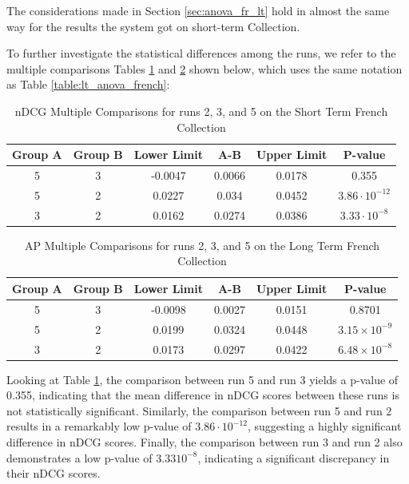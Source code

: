 The considerations made in Section \ref{sec:anova_fr_lt} hold in almost the same way for the results the system got on short-term Collection.  

To further investigate the statistical differences among the runs, we refer to the multiple comparisons Tables \ref{table:st_anova_french} and \ref{table:st_anova_french_ap} shown below, which uses the same notation as Table \ref{table:lt_anova_french}:

\begin{table}[!h]
    \centering
    \caption{\ac{nDCG} Multiple Comparisons for runs 2, 3, and 5 on the Short Term French Collection}
    \label{table:st_anova_french}
    \begin{tabular}{cccccc}
    \hline
    Group A & Group B & Lower Limit & A-B & Upper Limit & P-value \\ \hline
    5 & 3 & -0.0047 & 0.0066 & 0.0178 & 0.355 \\
    5 & 2 & 0.0227 & 0.034 & 0.0452 & $3.86 \cdot 10^{-12}$ \\
    3 & 2 & 0.0162 & 0.0274 & 0.0386 & $3.33 \cdot 10^{-8}$ \\ \hline
    \end{tabular}
\end{table}

\begin{table}[!h]
    \centering
    \caption{\ac{AP} Multiple Comparisons for runs 2, 3, and 5 on the Long Term French Collection}
    \label{table:st_anova_french_ap}
    \begin{tabular}{cccccc}
    \hline
    Group A & Group B & Lower Limit & A-B & Upper Limit & P-value \\ \hline
    5 & 3 & -0.0098 & 0.0027 & 0.0151 & 0.8701 \\
    5 & 2 & 0.0199 & 0.0324 & 0.0448 & $3.15 \times 10^{-9}$ \\
    3 & 2 & 0.0173 & 0.0297 & 0.0422 & $6.48 \times 10^{-8}$ \\ \hline
    \end{tabular}
\end{table}
 
Looking at Table \ref{table:st_anova_french}, the comparison between run 5 and run 3 yields a p-value of 0.355, indicating that the mean difference in \ac{nDCG} scores between these runs is not statistically significant. 
Similarly, the comparison between run 5 and run 2 results in a remarkably low p-value of $3.86 \cdot 10^{-12}$, suggesting a highly significant difference in \ac{nDCG} scores. 
Finally, the comparison between run 3 and run 2 also demonstrates a low p-value of $3.33 10^{-8}$, indicating a significant discrepancy in their \ac{nDCG} scores.

